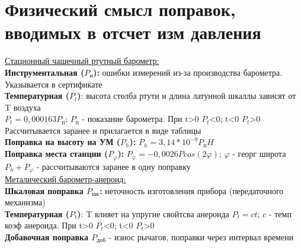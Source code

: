 
\section{Физический смысл поправок, вводимых в отсчет изм давления}
\underline{Стационный чашечный ртутный барометр:}\\
\textbf{Инструментальная ($P_\text{н}$):} ошибки измерений из-за производства барометра. Указывается в сертификате\\

\textbf{Температурная ($P_t$)}: высота столба ртути и длина латунной шкаллы зависят от T воздуха\\
$P_t=0,000163P_\text{п}$; $P_\text{п}$ - показание барометра. При t>0 $P_t$<0; t<0 $P_t$>0\\
Рассчитывается заранее и прилагается в виде таблицы\\

\textbf{Поправка на высоту на УМ ($P_h$):} $P_h=3,14*10^{-9}P_\text{п}H$\\

\textbf{Поправка места станции ($P_\varphi$):} $P_\varphi=-0,0026Pcos(2\varphi)$; $\varphi$ - георг широта\\

$P_h+P_\varphi$ - рассчитываются заранее в одну поправку\\

\underline{Металический барометр-анероид:}\\
\textbf{Шкаловая поправка $P_\text{шк}$:} неточность изготовления прибора (передаточного механизма)\\
\textbf{Температурная ($P_t$)}: T влияет на упругие свойтсва анероида
$P_t=ct$; $c$ - темп коэф анероида. При t>0 $P_t$<0; t<0 $P_t$>0\\
\textbf{Добавочная поправка $P_\text{доб}$} - износ рычагов, поправки через интервал времени

